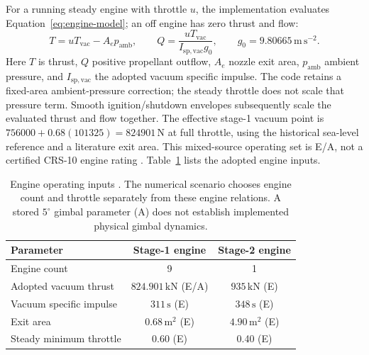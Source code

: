 For a running steady engine with throttle $u$, the implementation evaluates Equation~\eqref{eq:engine-model}; an off engine has zero thrust and flow:
\begin{equation}
 T=uT_{\mathrm{vac}}-A_ep_{\mathrm{amb}},\qquad
 Q=\frac{uT_{\mathrm{vac}}}{I_{\mathrm{sp,vac}}g_0},\qquad g_0=9.80665\,\mathrm{m\,s^{-2}}.
\label{eq:engine-model}
\end{equation}
Here $T$ is thrust, $Q$ positive propellant outflow, $A_e$ nozzle exit area, $p_{\mathrm{amb}}$ ambient pressure, and $I_{\mathrm{sp,vac}}$ the adopted vacuum specific impulse. The code retains a fixed-area ambient-pressure correction; the steady throttle does not scale that pressure term. Smooth ignition/shutdown envelopes subsequently scale the evaluated thrust and flow together. The effective stage-1 vacuum point is $756000+0.68(101325)=824901\,\mathrm{N}$ at full throttle, using the historical sea-level reference and a literature exit area. This mixed-source operating set is E/A, not a certified CRS-10 engine rating \cite{spacex2015,pezent2024}. Table~\ref{tab:engines} lists the adopted engine inputs.

\begin{table}[!htbp]
\centering\small
\begin{tabular}{@{}lcc@{}}
\toprule
Parameter & Stage-1 engine & Stage-2 engine \\
\midrule
Engine count & 9 & 1 \\
Adopted vacuum thrust & $824.901\,\mathrm{kN}$ (E/A) & $935\,\mathrm{kN}$ (E) \\
Vacuum specific impulse & $311\,\mathrm{s}$ (E) & $348\,\mathrm{s}$ (E) \\
Exit area & $0.68\,\mathrm{m^2}$ (E) & $4.90\,\mathrm{m^2}$ (E) \\
Steady minimum throttle & 0.60 (E) & 0.40 (E) \\
\bottomrule
\end{tabular}
\caption{Engine operating inputs \cite{pezent2024,spacex2015}. The numerical scenario chooses engine count and throttle separately from these engine relations. A stored $5^\circ$ gimbal parameter (A) does not establish implemented physical gimbal dynamics.}
\label{tab:engines}
\end{table}


